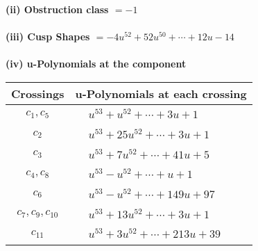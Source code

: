 \documentclass[1p]{elsarticle_modified}
\theoremstyle{definition}
\begin{document}
\flushleft \textbf{(ii) Obstruction class $= -1$}\\~\\
\flushleft \textbf{(iii) Cusp Shapes $= -4 u^{52}+52 u^{50}+\cdots+12 u-14$}\\~\\
\newpage\renewcommand{\arraystretch}{1}
\flushleft \textbf{(iv) u-Polynomials at the component}\newline \\
\begin{tabular}{m{50pt}|m{274pt}}
Crossings & \hspace{64pt}u-Polynomials at each crossing \\
\hline $$\begin{aligned}c_{1},c_{5}\end{aligned}$$&$\begin{aligned}
&u^{53}+u^{52}+\cdots+3 u+1
\end{aligned}$\\
\hline $$\begin{aligned}c_{2}\end{aligned}$$&$\begin{aligned}
&u^{53}+25 u^{52}+\cdots+3 u+1
\end{aligned}$\\
\hline $$\begin{aligned}c_{3}\end{aligned}$$&$\begin{aligned}
&u^{53}+7 u^{52}+\cdots+41 u+5
\end{aligned}$\\
\hline $$\begin{aligned}c_{4},c_{8}\end{aligned}$$&$\begin{aligned}
&u^{53}- u^{52}+\cdots+u+1
\end{aligned}$\\
\hline $$\begin{aligned}c_{6}\end{aligned}$$&$\begin{aligned}
&u^{53}- u^{52}+\cdots+149 u+97
\end{aligned}$\\
\hline $$\begin{aligned}c_{7},c_{9},c_{10}\end{aligned}$$&$\begin{aligned}
&u^{53}+13 u^{52}+\cdots+3 u+1
\end{aligned}$\\
\hline $$\begin{aligned}c_{11}\end{aligned}$$&$\begin{aligned}
&u^{53}+3 u^{52}+\cdots+213 u+39
\end{aligned}$\\
\hline
\end{tabular}\\~\\
\end{document}
